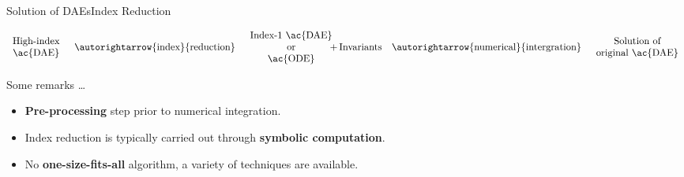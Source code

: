 \begin{frame}{Solution of \aclp{DAE}}{Index Reduction}
  \begin{bbox}
  \vspace{-1.0em}
  \begin{equation*}
      \begin{array}{c}
        \text{High-index} \\
        \text{\ac{DAE}}
      \end{array}
      \quad \autorightarrow{\text{index}}{\text{reduction}} \quad
      \begin{array}{c}
        \text{Index-1 \ac{DAE}}  \\
        \text{or} \\
        \text{\ac{ODE}}
      \end{array} {\hspace{-0.75em}+\,\text{Invariants}}
      \quad \autorightarrow{\text{numerical}}{\text{intergration}} \quad
      \begin{array}{c}
        \text{Solution of} \\
        \text{original \ac{DAE}}
      \end{array}
    \end{equation*}
  \end{bbox}
  \vspace{1.0em}
  Some remarks \dots
  \begin{itemize}
    \item \textbf{Pre-processing} step prior to numerical integration.
    \item Index reduction is typically carried out through \textbf{symbolic computation}.
    \item No \textbf{one-size-fits-all} algorithm, a variety of techniques are available.
  \end{itemize}
\end{frame}

